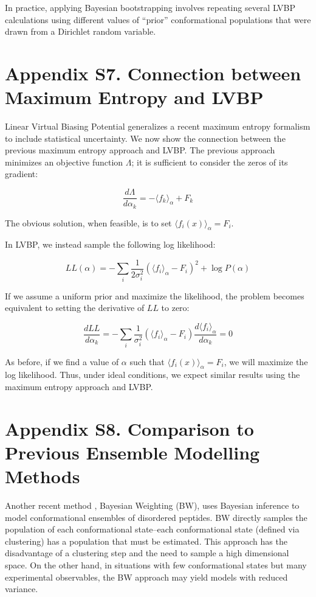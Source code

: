 \documentclass[journal=jacsat,manuscript=article]{achemso}
\begin{document}
In practice, applying Bayesian bootstrapping involves repeating several LVBP calculations using different values of ``prior'' conformational populations that were drawn from a Dirichlet random variable.

\section{Appendix S7.  Connection between Maximum Entropy and LVBP}


Linear Virtual Biasing Potential generalizes a recent maximum entropy formalism \cite{chodera2012} to include statistical uncertainty.  We now show the connection between the previous maximum entropy approach \cite{chodera2012} and LVBP.  The previous approach minimizes an objective function $\Lambda$; it is sufficient to consider the zeros of its gradient:

$$\frac{d\Lambda}{d\alpha_k} = -\langle f_k \rangle_\alpha + F_k$$

The obvious solution, when feasible, is to set $\langle f_i(x) \rangle_\alpha = F_i$.  

In LVBP, we instead sample the following log likelihood:

$$LL(\alpha) = -\sum_i \frac{1}{2\sigma_i^2}(\langle f_i\rangle _\alpha - F_i)^2 + \log P(\alpha)$$

If we assume a uniform prior and maximize the likelihood, the problem becomes equivalent to setting the derivative of $LL$ to zero:

$$ \frac{dLL}{d\alpha_k} =  -\sum_i \frac{1}{\sigma_i^2} (\langle f_i\rangle _\alpha - F_i) \frac{d\langle f_i\rangle _\alpha}{d\alpha_k} = 0$$

As before, if we find a value of $\alpha$ such that $\langle f_i(x) \rangle_\alpha = F_i$, we will maximize the log likelihood.  Thus, under ideal conditions, we expect similar results using the maximum entropy approach and LVBP.  

\clearpage %

\section{Appendix S8.  Comparison to Previous Ensemble Modelling Methods}
  
Another recent method \cite{fisher2010}, Bayesian Weighting (BW), uses Bayesian inference to model conformational ensembles of disordered peptides.  BW directly samples the population of each conformational state--each conformational state (defined via clustering) has a population that must be estimated.  This approach has the disadvantage of a clustering step and the need to sample a high dimensional space. On the other hand, in situations with few conformational states but many experimental observables, the BW approach may yield models with reduced variance. 
\end{document}
